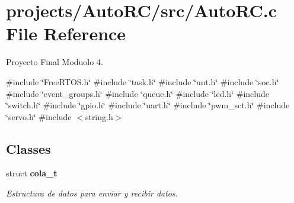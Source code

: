 \section{projects/\+Auto\+R\+C/src/\+Auto\+RC.c File Reference}
\label{_auto_r_c_8c}


Proyecto Final Moduolo 4.  


{\ttfamily \#include \char`\"{}Free\+R\+T\+O\+S.\+h\char`\"{}}\newline
{\ttfamily \#include \char`\"{}task.\+h\char`\"{}}\newline
{\ttfamily \#include \char`\"{}unt.\+h\char`\"{}}\newline
{\ttfamily \#include \char`\"{}soc.\+h\char`\"{}}\newline
{\ttfamily \#include \char`\"{}event\+\_\+groups.\+h\char`\"{}}\newline
{\ttfamily \#include \char`\"{}queue.\+h\char`\"{}}\newline
{\ttfamily \#include \char`\"{}led.\+h\char`\"{}}\newline
{\ttfamily \#include \char`\"{}switch.\+h\char`\"{}}\newline
{\ttfamily \#include \char`\"{}gpio.\+h\char`\"{}}\newline
{\ttfamily \#include \char`\"{}uart.\+h\char`\"{}}\newline
{\ttfamily \#include \char`\"{}pwm\+\_\+sct.\+h\char`\"{}}\newline
{\ttfamily \#include \char`\"{}servo.\+h\char`\"{}}\newline
{\ttfamily \#include $<$string.\+h$>$}\newline
\subsection*{Classes}
\begin{DoxyCompactItemize}
\item 
struct \textbf{ cola\+\_\+t}
\begin{DoxyCompactList}\small\item\em Estructura de datos para enviar y recibir datos. \end{DoxyCompactList}\end{DoxyCompactItemize}
